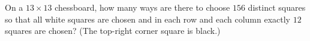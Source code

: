 On a $13\times13$ chessboard, how many ways are there to choose $156$ distinct squares so that all white squares are chosen and in each row and each column exactly $12$ squares are chosen? (The top-right corner square is black.)
